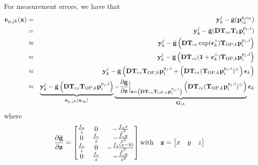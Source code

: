 \documentclass[a4paper]{article}
\begin{document}
For measurement errors, we have that
\begin{eqnarray}
    \bm{\mathbf{e}}_{y, jk}(\bm{\mathbf{x}}) 
    &=& \bm{\mathbf{y}}^j_k - \bar{\bm{\mathbf{g}}}(\bm{\mathbf{p}}_{c_k}^{p_j c_k})\\
    &=& \bm{\mathbf{y}}^j_k - \bar{\bm{\mathbf{g}}}(\bm{\mathbf{D}} \bm{\mathbf{T}}_{cv} \bm{\mathbf{T}}_{k}\bm{\mathbf{p}}_i^{p_j, i})\\
    &\approx& \bm{\mathbf{y}}^j_k - \bar{\bm{\mathbf{g}}}\left(\bm{\mathbf{D}} \bm{\mathbf{T}}_{cv}  \exp(\bm{\mathbf{\epsilon}}_k^\wedge) \bm{\mathbf{T}}_{\text{OP}, k}\bm{\mathbf{p}}_i^{p_j, i}  \right)\\
    &\approx& \bm{\mathbf{y}}^j_k - \bar{\bm{\mathbf{g}}}\left(  \bm{\mathbf{D}} \bm{\mathbf{T}}_{cv}  (\bm{\mathbf{1}} + \bm{\mathbf{\epsilon}}_k^\wedge) \bm{\mathbf{T}}_{\text{OP}, k}\bm{\mathbf{p}}_i^{p_j, i}  \right)\\    
    &\approx& \bm{\mathbf{y}}^j_k - \bar{\bm{\mathbf{g}}}\left(  \bm{\mathbf{D}} \bm{\mathbf{T}}_{cv} \bm{\mathbf{T}}_{\text{OP}, k}\bm{\mathbf{p}}_i^{p_j, i} + \left( \bm{\mathbf{D}} \bm{\mathbf{T}}_{cv} (\bm{\mathbf{T}}_{\text{OP}, k}\bm{\mathbf{p}}_i^{p_j, i})^{\odot}  \right) \bm{\mathbf{\epsilon}}_k \right)\\    
    &\approx& \underbrace{\bm{\mathbf{y}}^j_k - \bar{\bm{\mathbf{g}}}\left(  \bm{\mathbf{D}} \bm{\mathbf{T}}_{cv} \bm{\mathbf{T}}_{\text{OP}, k}\bm{\mathbf{p}}_i^{p_j, i}\right)}_{\bm{\mathbf{e}}_{y, jk}(\bm{\mathbf{x}}_{\text{op}})} \underbrace{- \dfrac{\partial \bar{\bm{\mathbf{g}}}}{\partial \bm{\mathbf{z}}}\Big|_{\bm{\mathbf{z}}=\left(\bm{\mathbf{D}} \bm{\mathbf{T}}_{cv} \bm{\mathbf{T}}_{\text{OP}, k}\bm{\mathbf{p}}_i^{p_j, i}\right)} \left( \bm{\mathbf{D}} \bm{\mathbf{T}}_{cv} (\bm{\mathbf{T}}_{\text{OP}, k}\bm{\mathbf{p}}_i^{p_j, i})^{\odot}  \right)}_{\bm{\mathbf{G}}_{jk}} \bm{\mathbf{\epsilon}}_k 
\end{eqnarray}
where
\begin{eqnarray}
    \dfrac{\partial \bar{\bm{\mathbf{g}}}}{\partial \bm{\mathbf{z}}} = \begin{bmatrix}
      \frac{f_u}{z} & 0 & - \frac{f_u x}{z^2}\\
      0 & \frac{f_v}{z} & - \frac{f_v y}{z^2}\\
      \frac{f_u}{z} & 0 & - \frac{f_u (x-b)}{z^2}\\
      0 & \frac{f_v}{z} & - \frac{f_v y}{z^2}\\
    \end{bmatrix}
    \text{with} \quad \bm{\mathbf{z}} = \begin{bmatrix}
      x & y & z
    \end{bmatrix}
\end{eqnarray}
\end{document}
